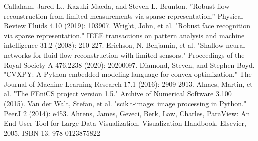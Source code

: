 \documentclass[conference]{IEEEtran}
\begin{document}
\begin{thebibliography}{00}
 Callaham, Jared L., Kazuki Maeda, and Steven L. Brunton. ''Robust flow reconstruction from limited measurements via sparse representation.'' Physical Review Fluids 4.10 (2019): 103907.
%
 Wright, John, et al. "Robust face recognition via sparse representation." IEEE transactions on pattern analysis and machine intelligence 31.2 (2008): 210-227.
%
 Erichson, N. Benjamin, et al. "Shallow neural networks for fluid flow reconstruction with limited sensors." Proceedings of the Royal Society A 476.2238 (2020): 20200097.
%
 Diamond, Steven, and Stephen Boyd. "CVXPY: A Python-embedded modeling language for convex optimization." The Journal of Machine Learning Research 17.1 (2016): 2909-2913.
%
 Alnaes, Martin, et al. "The FEniCS project version 1.5." Archive of Numerical Software 3.100 (2015).
%
 Van der Walt, Stefan, et al. "scikit-image: image processing in Python." PeerJ 2 (2014): e453.
%
 Ahrens, James, Geveci, Berk, Law, Charles, ParaView: An End-User Tool for Large Data Visualization, Visualization Handbook, Elsevier, 2005, ISBN-13: 978-0123875822
%
\end{thebibliography}

\vspace{12pt}
\end{document}
